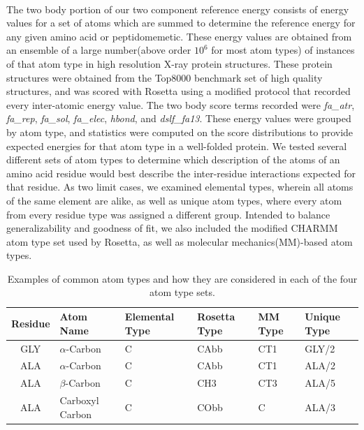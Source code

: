 \paragraph{}
The two body portion of our two component reference energy consists of energy values for a set of atoms which are summed to determine the reference energy for any given amino acid or peptidomemetic.
These energy values are obtained from an ensemble of a large number(above order $10^6$ for most atom types) of instances of that atom type in high resolution X-ray protein structures.
These protein structures were obtained from the Top8000 benchmark set of high quality structures\cite{lovell_structure_2003}, and was scored with Rosetta using a modified protocol that recorded every inter-atomic energy value.
The two body score terms recorded were \textit{fa\_atr}, \textit{fa\_rep}, \textit{fa\_sol}, \textit{fa\_elec}, \textit{hbond}, and \textit{dslf\_fa13}.
These energy values were grouped by atom type, and statistics were computed on the score distributions to provide expected energies for that atom type in a well-folded protein.
We tested several different sets of atom types to determine which description of the atoms of an amino acid residue would best describe the inter-residue interactions expected for that residue.
As two limit cases, we examined elemental types, wherein all atoms of the same element are alike, as well as unique atom types, where every atom from every residue type was assigned a different group.
Intended to balance generalizability and goodness of fit, we also included the modified CHARMM atom type set used by Rosetta\cite{leaver-fay_chapter_2011,bernard_charmm_1983}, as well as molecular mechanics(MM)-based atom types\cite{renfrew_incorporation_2012}.


\begin{table}[!htbp]

\fontsize{9pt}{9pt}
\selectfont

\begin{tabular}{c|lllll}
Residue & Atom Name & Elemental Type & Rosetta Type & MM Type & Unique Type\\
\hline
GLY & $\alpha$-Carbon & C & CAbb & CT1 & GLY/2\\
ALA & $\alpha$-Carbon & C & CAbb & CT1 & ALA/2\\
ALA & $\beta$-Carbon & C & CH3 & CT3 & ALA/5\\
ALA & Carboxyl Carbon & C & CObb & C & ALA/3\\
\end{tabular}

\fontsize{10pt}{11pt}
\selectfont
\caption{Examples of common atom types and how they are considered in each of the four atom type sets.}
\label{tab:atypes_example}

\end{table}



